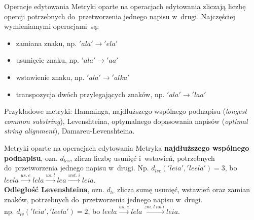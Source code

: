 \documentclass[11pt,pdftex,mathserif]{beamer}\usepackage[]{graphicx}\usepackage[]{color}
\theoremstyle{definition}
\begin{document}
% 


\begin{frame}{Operacje edytowania}
Metryki oparte na operacjach edytowania zliczają liczbę opercji potrzebnych do~przetworzenia jednego napisu w~drugi. Najczęściej wymieniamymi operacjami~są:
\begin{itemize}
\item zamiana znaku, np. $'ala' \rightarrow 'ela'$
\item usunięcie znaku, np. $'ala' \rightarrow 'aa'$
\item wstawienie znaku, np. $'ala' \rightarrow 'alka'$
\item transpozycja dwóch przylegających znaków, np. $'ala' \rightarrow 'laa'$
\end{itemize}
\pause
Przykładowe metryki: Hamminga, najdłuższego wspólnego podnapisu (\emph{longest common substring}), Levenshteina, optymalnego dopasowania napisów (\emph{optimal string alignment}), Damareu-Levenshteina.

\end{frame}

\begin{frame}{Metryki oparte na operacjach edytowania}
Metryka \textbf{najdłuższego wspólnego podnapisu}, ozn. $d_{lcs}$, zlicza liczbę usunięć i~wstawień, potrzebnych do~przetworzenia jednego napisu w~drugi. Np. $d_{lsc}('leia', 'leela') = 3$, bo~$leela  \xrightarrow{us.\ e} lela  \xrightarrow{us.\ l} lea  \xrightarrow{wst.\ i} leia$.\\
\pause
\textbf{Odległość Levenshteina}, ozn. $d_{lv}$ zlicza sumę usunięć, wstawień oraz zamian znaków, potrzebnych do~przetworzenia jednego napisu w~drugi. \\


\pause
np.
$d_{lv}('leia', 'leela') = 2$, bo $leela  \xrightarrow{us.\ e} lela  \xrightarrow{zm.\ l\ na\ i} leia$. 
\end{frame}
\end{document}
